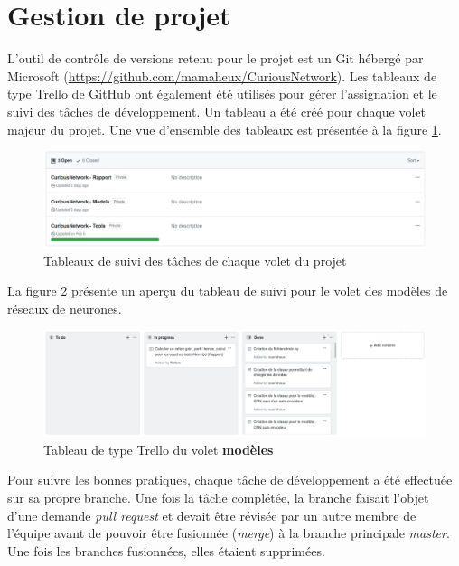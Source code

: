 \section{Gestion de projet}
    L'outil de contrôle de versions retenu pour le projet est un Git hébergé par Microsoft (\url{https://github.com/mamaheux/CuriousNetwork}). Les tableaux de type Trello de GitHub ont également été utilisés pour gérer l'assignation et le suivi des tâches de développement. Un tableau a été créé pour chaque volet majeur du projet. Une vue d'ensemble des tableaux est présentée à la figure \ref{fig:trello_boards}.

    \begin{figure}[H]
        \centering
        \includegraphics[width=15cm]{images/3_sub_projects.png}
        \caption{Tableaux de suivi des tâches de chaque volet du projet}
        \label{fig:trello_boards}
    \end{figure}

    La figure \ref{fig:trello_board_models} présente un aperçu du tableau de suivi pour le volet des modèles de réseaux de neurones.
    \begin{figure}[H]
        \centering
        \includegraphics[width=15cm]{images/trello_board.png}
        \caption[Tableau de type Trello du volet modèles]{Tableau de type Trello du volet \textbf{modèles}}
        \label{fig:trello_board_models}
    \end{figure}

    Pour suivre les bonnes pratiques, chaque tâche de développement a été effectuée sur sa propre branche. Une fois la tâche complétée, la branche faisait l'objet d'une demande \textit{pull request} et devait être révisée par un autre membre de l'équipe avant de pouvoir être fusionnée (\textit{merge}) à la branche principale \textit{master}. Une fois les branches fusionnées, elles étaient supprimées.\\
    
